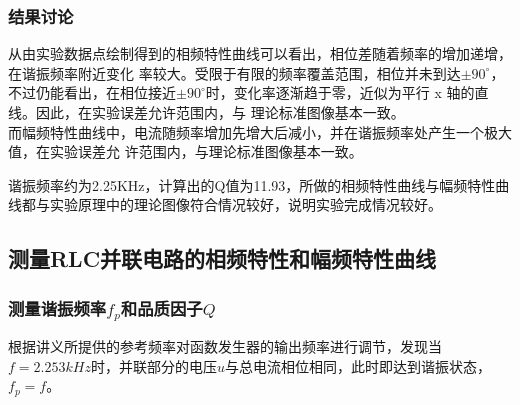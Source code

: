 \documentclass[UTF-8,twoside,cs4size]{ctexart}
\begin{document}
        \subsubsection{结果讨论}
        从由实验数据点绘制得到的相频特性曲线可以看出，相位差随着频率的增加递增，在谐振频率附近变化
        率较大。受限于有限的频率覆盖范围，相位并未到达$\pm90^{\circ}$，不过仍能看出，在相位接近$\pm90^{\circ}$时，变化率逐渐趋于零，近似为平行 x 轴的直线。因此，在实验误差允许范围内，与
        理论标准图像基本一致。\\
        而幅频特性曲线中，电流随频率增加先增大后减小，并在谐振频率处产生一个极大值，在实验误差允
        许范围内，与理论标准图像基本一致。
    
        谐振频率约为2.25KHz，计算出的Q值为11.93，所做的相频特性曲线与幅频特性曲线都与实验原理中的理论图像符合情况较好，说明实验完成情况较好。
    \subsection{测量RLC并联电路的相频特性和幅频特性曲线}
        \subsubsection{测量谐振频率$f_p$和品质因子$Q$}
            根据讲义所提供的参考频率对函数发生器的输出频率进行调节，发现当$f = 2.253kHz$时，并联部分的电压$u$与总电流相位相同，此时即达到谐振状态，$f_p = f$。\\
\end{document}
